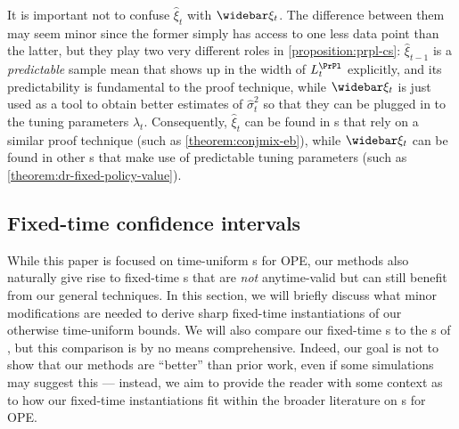 It is important not to confuse $\widehat \xi_t$ with $\widebar \xi_t$. The difference between them may seem minor since the former simply has access to one less data point than the latter, but they play two very different roles in \cref{proposition:prpl-cs}: $\widehat \xi_{t-1}$ is a \emph{predictable} sample mean that shows up in the width of $L_t^\PrPl$ explicitly, and its predictability is fundamental to the proof technique, while $\widebar \xi_t$ is just used as a tool to obtain better estimates of $\widehat \sigma_t^2$ so that they can be plugged in to the tuning parameters $\lambda_t$. Consequently, $\widehat \xi_t$ can be found in \cs{}s that rely on a similar proof technique (such as \cref{theorem:conjmix-eb}), while $\widebar \xi_t$ can be found in other \cs{}s that make use of predictable tuning parameters (such as \cref{theorem:dr-fixed-policy-value}).


\subsection{Fixed-time confidence intervals}
While this paper is focused on time-uniform \cs{}s for OPE, our methods also naturally give rise to fixed-time \ci{}s that are \emph{not} anytime-valid but can still benefit from our general techniques. In this section, we will briefly discuss what minor modifications are needed to derive sharp fixed-time instantiations of our otherwise time-uniform bounds. We will also compare our fixed-time \ci{}s to the \ci{}s of \citet{thomas2015high}, but this comparison is by no means comprehensive. Indeed, our goal is not to show that our methods are ``better'' than prior work, even if some simulations may suggest this --- instead, we aim to provide the reader with some context as to how our fixed-time instantiations fit within the broader literature on \ci{}s for OPE\@.

